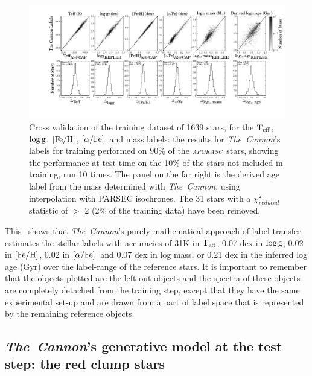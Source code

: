 \documentclass[12pt, preprint]{aastex}
\newcommand{\project}[1]{\textsl{#1}}
\newcommand{\tc}{\project{The~Cannon}}
\newcommand{\apokasc}{\project{\textsc{apokasc}}}
\newcommand{\teff}{\mbox{$\rm T_{eff}$}}
\newcommand{\feh}{\mbox{$\rm [Fe/H]$}}
\newcommand{\alphafe}{\mbox{$\rm [\alpha/Fe]$}}
\newcommand{\logg}{\mbox{$\rm \log g$}}
\begin{document}
\begin{figure}[p]
\centering
        \includegraphics[scale=0.4]{./plots/validation_1639_6_quad.pdf}
  \caption{Cross validation of the training dataset of 1639 stars, for the \teff, \logg, \feh, \alphafe\ and mass labels: the results for \tc's labels for training performed on 90\% of the \apokasc\ stars, showing the performance at test time on the 10\% of the stars not included in training, run 10 times. The panel on the far right is the derived age label from the mass determined with \tc, using interpolation with PARSEC isochrones. The 31 stars with a $\chi_{reduced}^2$ statistic of $>$ 2 (2\% of the training data) have been removed.}
\label{fig:validation1}
\end{figure}

This \figurename\ shows that \tc 's purely mathematical approach of label transfer estimates the stellar labels with accuracies of 31K in \teff, 0.07 dex in \logg, 0.02 in \feh, 0.02 in \alphafe\ and  0.07 dex in log mass, or 0.21 dex in the inferred log age (Gyr) over the label-range of the reference stars. It is important to remember that the objects plotted are the left-out objects and the spectra of these objects are completely detached from the training step,  except that they have the same experimental set-up and are drawn from a part of label space that is represented by the remaining reference objects.


\subsection{\tc's generative model at the test step: the red clump stars}
\end{document}
